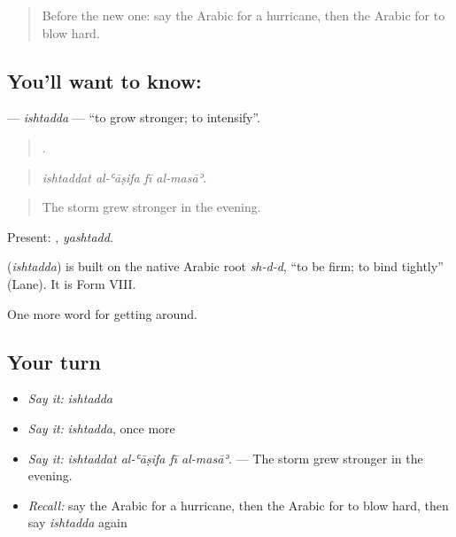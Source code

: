 \label{lesson:AR-C482-ishtadda}



\begin{quote}
Before the new one: say the Arabic for a hurricane, then the Arabic for to blow hard.
\end{quote}

\subsection*{You'll want to know: }
\textbf{} — \emph{ishtadda} — \textquotedblleft{}to grow stronger; to intensify\textquotedblright{}.

\begin{quote}
   .
\end{quote}

\begin{quote}
\emph{ishtaddat al-ʿāṣifa fī al-masāʾ.}
\end{quote}

\begin{quote}
The storm grew stronger in the evening.
\end{quote}

Present: , \emph{yashtadd}.

\begin{cousinweb}
\textbf{} (\emph{ishtadda}) is built on the native Arabic root \emph{sh-d-d}, \textquotedblleft{}to be firm; to bind tightly\textquotedblright{} (Lane). It is Form VIII.
\end{cousinweb}

\begin{grammarlens}[title={What you've built}]
One more word for getting around.
\end{grammarlens}

\subsection*{Your turn}
\begin{itemize}
\raggedright
  \item \emph{Say it:} \emph{ishtadda}
  \item \emph{Say it:} \emph{ishtadda}, once more
  \item \emph{Say it:} \emph{ishtaddat al-ʿāṣifa fī al-masāʾ.} — The storm grew stronger in the evening.
  \item \emph{Recall:} say the Arabic for a hurricane, then the Arabic for to blow hard, then say \emph{ishtadda} again
\end{itemize}

